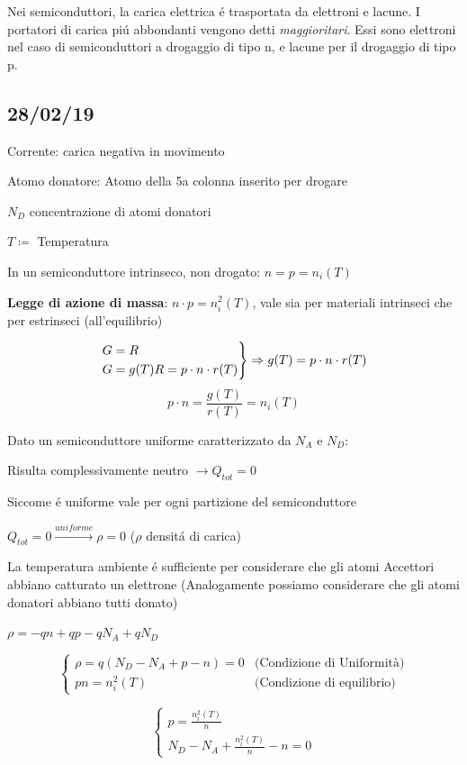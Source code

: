\documentclass{article}
\begin{document}
Nei semiconduttori, la carica elettrica \'e trasportata da elettroni e lacune. I portatori di carica pi\'u abbondanti vengono detti \textit{maggioritari}. Essi sono elettroni nel caso di semiconduttori a drogaggio di tipo n, e lacune  per il drogaggio di tipo p.

\subsection{28/02/19}
Corrente: carica negativa in movimento

Atomo donatore: Atomo della 5a colonna inserito per drogare

$N_D$ concentrazione di atomi donatori

$T\coloneqq$ Temperatura

In un semiconduttore intrinseco, non drogato: $n = p = n_i(T)$

\textbf{Legge di azione di massa}: $n\cdot p = n_i^2(T)$, vale sia per materiali intrinseci che per estrinseci (all'equilibrio)

\[
\begin{rcases}
    G = R\\
    G = g(T)
    R = p\cdot n \cdot r(T)
\end{rcases} \Rightarrow
g(T) = p\cdot n\cdot r(T)
\]
\[ p\cdot n = \frac{g(T)}{r(T)} = n_i(T)\]

Dato un semiconduttore uniforme caratterizzato da $N_A$ e $N_D$:

Risulta complessivamente neutro $\rightarrow Q_{tot} = 0$

Siccome \'e uniforme vale per ogni partizione del semiconduttore

$Q_{tot} = 0 \xrightarrow{uniforme} \rho = 0$ ($\rho$ densit\'a di carica)

La temperatura ambiente \'e sufficiente per considerare che gli atomi Accettori abbiano catturato un elettrone (Analogamente possiamo considerare che gli atomi donatori abbiano tutti donato)

$\rho = -qn +qp - qN_A + qN_D$

\[
    \begin{cases}
        \rho = q(N_D - N_A + p -n) = 0 & \text{(Condizione di Uniformità)} \\
        pn = n_i^2(T) & \text{(Condizione di equilibrio)}
    \end{cases}
\]

\[
    \begin{cases}
        p = \frac{n_i^2(T)}{n}\\
        N_D - N_A + \frac{n_i^2(T)}{n} - n = 0
    \end{cases}
\]
\end{document}
